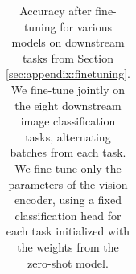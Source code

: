 \begin{appendix}
\begin{table}
\begin{tabular}{lrlrrrrrrrr}
\bottomrule
\end{tabular}
\caption{
    Accuracy after fine-tuning for various models on downstream tasks from Section \ref{sec:appendix:finetuning}. We fine-tune jointly on the eight downstream image classification tasks, alternating batches from each task.
    We fine-tune only the parameters of the vision encoder, using a fixed classification head for each task initialized with the weights from the zero-shot model.
    \label{tab:appendix:joint_ft_ft}
    }
\end{table}

\begin{table}
\scriptsize
\centering
\setlength\tabcolsep{3pt}
\begin{tabular}{lrlrrrrrrrrr}     
\toprule                           


\end{tabular}
\end{table}
\end{appendix}
